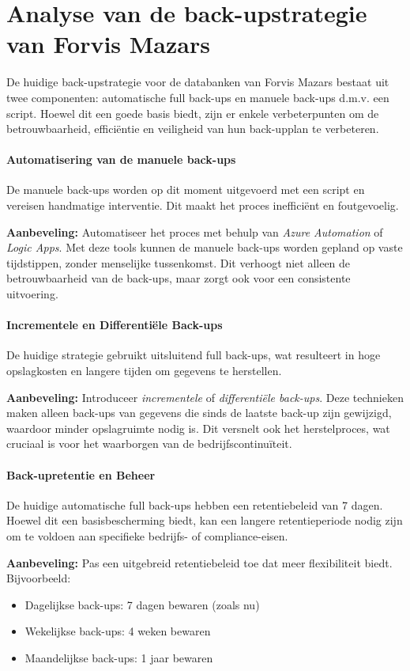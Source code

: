\chapter{Analyse van de back-upstrategie van Forvis Mazars}%
\label{ch:analyse}
De huidige back-upstrategie voor de databanken van Forvis Mazars bestaat uit twee componenten: automatische full back-ups en manuele back-ups d.m.v. een script. Hoewel dit een goede basis biedt, zijn er enkele verbeterpunten om de betrouwbaarheid, efficiëntie en veiligheid van hun back-upplan te verbeteren.

\subsubsection{Automatisering van de manuele back-ups}
De manuele back-ups worden op dit moment uitgevoerd met een script en vereisen handmatige interventie. Dit maakt het proces inefficiënt en foutgevoelig. 

\textbf{Aanbeveling:} Automatiseer het proces met behulp van \textit{Azure Automation} of \textit{Logic Apps}. Met deze tools kunnen de manuele back-ups worden gepland op vaste tijdstippen, zonder menselijke tussenkomst. Dit verhoogt niet alleen de betrouwbaarheid van de back-ups, maar zorgt ook voor een consistente uitvoering.

\subsubsection{Incrementele en Differentiële Back-ups}
De huidige strategie gebruikt uitsluitend full back-ups, wat resulteert in hoge opslagkosten en langere tijden om gegevens te herstellen.

\textbf{Aanbeveling:} Introduceer \textit{incrementele} of \textit{differentiële back-ups}. Deze technieken maken alleen back-ups van gegevens die sinds de laatste back-up zijn gewijzigd, waardoor minder opslagruimte nodig is. Dit versnelt ook het herstelproces, wat cruciaal is voor het waarborgen van de bedrijfscontinuïteit.

\subsubsection{Back-upretentie en Beheer}
De huidige automatische full back-ups hebben een retentiebeleid van 7 dagen. Hoewel dit een basisbescherming biedt, kan een langere retentieperiode nodig zijn om te voldoen aan specifieke bedrijfs- of compliance-eisen.

\textbf{Aanbeveling:} Pas een uitgebreid retentiebeleid toe dat meer flexibiliteit biedt. Bijvoorbeeld:
\begin{itemize}
    \item Dagelijkse back-ups: 7 dagen bewaren (zoals nu)
    \item Wekelijkse back-ups: 4 weken bewaren
    \item Maandelijkse back-ups: 1 jaar bewaren
\end{itemize}



